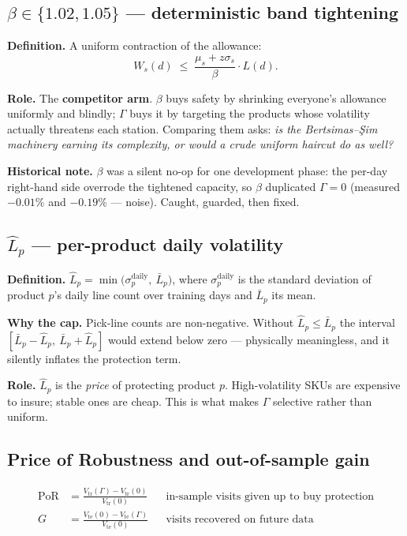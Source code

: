\documentclass[11pt,a4paper]{article}
\newcommand{\vtr}{V_{\mathrm{tr}}}
\newcommand{\vte}{V_{\mathrm{te}}}
\newcommand{\PoR}{\mathrm{PoR}}
\begin{document}
\subsection{\texorpdfstring{$\beta\in\{1.02,1.05\}$}{beta} --- deterministic band tightening}

\textbf{Definition.} A uniform contraction of the allowance:
\begin{equation}
  W_s(d) \;\le\; \frac{\mu_s + z\sigma_s}{\beta}\cdot L(d).
  \label{eq:beta}
\end{equation}

\textbf{Role.} The \textbf{competitor arm}. $\beta$ buys safety by shrinking
everyone's allowance uniformly and blindly; $\Gamma$ buys it by targeting the
products whose volatility actually threatens each station. Comparing them asks:
\emph{is the Bertsimas--\c{S}im machinery earning its complexity, or would a
crude uniform haircut do as well?}

\textbf{Historical note.} $\beta$ was a silent no-op for one development phase:
the per-day right-hand side overrode the tightened capacity, so $\beta$
duplicated $\Gamma=0$ (measured $-0.01\%$ and $-0.19\%$ --- noise). Caught,
guarded, then fixed.

\subsection{\texorpdfstring{$\hat L_p$}{lhat} --- per-product daily volatility}

\textbf{Definition.}
$\hat L_p = \min\bigl(\sigma_p^{\mathrm{daily}},\ \bar L_p\bigr)$,
where $\sigma_p^{\mathrm{daily}}$ is the standard deviation of product $p$'s
daily line count over training days and $\bar L_p$ its mean.

\textbf{Why the cap.} Pick-line counts are non-negative. Without
$\hat L_p\le\bar L_p$ the interval $[\bar L_p-\hat L_p,\ \bar L_p+\hat L_p]$
would extend below zero --- physically meaningless, and it silently inflates
the protection term.

\textbf{Role.} $\hat L_p$ is the \emph{price} of protecting product $p$.
High-volatility SKUs are expensive to insure; stable ones are cheap. This is
what makes $\Gamma$ selective rather than uniform.

\subsection{Price of Robustness and out-of-sample gain}

\begin{align}
  \PoR &= \frac{\vtr(\Gamma)-\vtr(0)}{\vtr(0)}
  &&\text{in-sample visits given up to buy protection} \label{eq:por}\\[3pt]
  G    &= \frac{\vte(0)-\vte(\Gamma)}{\vte(0)}
  &&\text{visits recovered on future data} \label{eq:gain}
\end{align}
\end{document}
